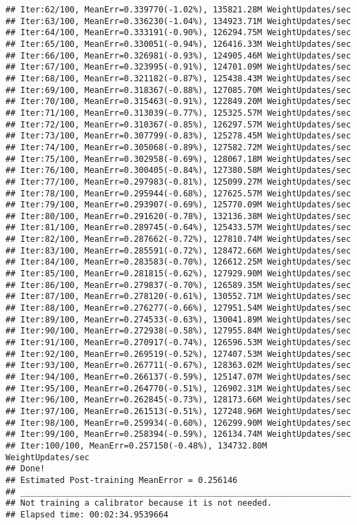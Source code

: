 \documentclass[]{book}
\theoremstyle{definition}
\theoremstyle{definition}
\theoremstyle{definition}
\theoremstyle{remark}
\begin{document}
\begin{verbatim}
## Iter:62/100, MeanErr=0.339770(-1.02%), 135821.28M WeightUpdates/sec
## Iter:63/100, MeanErr=0.336230(-1.04%), 134923.71M WeightUpdates/sec
## Iter:64/100, MeanErr=0.333191(-0.90%), 126294.75M WeightUpdates/sec
## Iter:65/100, MeanErr=0.330051(-0.94%), 126416.33M WeightUpdates/sec
## Iter:66/100, MeanErr=0.326981(-0.93%), 124905.46M WeightUpdates/sec
## Iter:67/100, MeanErr=0.323995(-0.91%), 124701.09M WeightUpdates/sec
## Iter:68/100, MeanErr=0.321182(-0.87%), 125438.43M WeightUpdates/sec
## Iter:69/100, MeanErr=0.318367(-0.88%), 127085.70M WeightUpdates/sec
## Iter:70/100, MeanErr=0.315463(-0.91%), 122849.20M WeightUpdates/sec
## Iter:71/100, MeanErr=0.313039(-0.77%), 125325.57M WeightUpdates/sec
## Iter:72/100, MeanErr=0.310367(-0.85%), 126297.57M WeightUpdates/sec
## Iter:73/100, MeanErr=0.307799(-0.83%), 125278.45M WeightUpdates/sec
## Iter:74/100, MeanErr=0.305068(-0.89%), 127582.72M WeightUpdates/sec
## Iter:75/100, MeanErr=0.302958(-0.69%), 128067.18M WeightUpdates/sec
## Iter:76/100, MeanErr=0.300405(-0.84%), 127380.58M WeightUpdates/sec
## Iter:77/100, MeanErr=0.297983(-0.81%), 125099.27M WeightUpdates/sec
## Iter:78/100, MeanErr=0.295944(-0.68%), 127625.57M WeightUpdates/sec
## Iter:79/100, MeanErr=0.293907(-0.69%), 125770.09M WeightUpdates/sec
## Iter:80/100, MeanErr=0.291620(-0.78%), 132136.38M WeightUpdates/sec
## Iter:81/100, MeanErr=0.289745(-0.64%), 125433.57M WeightUpdates/sec
## Iter:82/100, MeanErr=0.287662(-0.72%), 127810.74M WeightUpdates/sec
## Iter:83/100, MeanErr=0.285591(-0.72%), 128472.66M WeightUpdates/sec
## Iter:84/100, MeanErr=0.283583(-0.70%), 126612.25M WeightUpdates/sec
## Iter:85/100, MeanErr=0.281815(-0.62%), 127929.90M WeightUpdates/sec
## Iter:86/100, MeanErr=0.279837(-0.70%), 126589.35M WeightUpdates/sec
## Iter:87/100, MeanErr=0.278120(-0.61%), 130552.71M WeightUpdates/sec
## Iter:88/100, MeanErr=0.276277(-0.66%), 127951.54M WeightUpdates/sec
## Iter:89/100, MeanErr=0.274533(-0.63%), 130041.89M WeightUpdates/sec
## Iter:90/100, MeanErr=0.272938(-0.58%), 127955.84M WeightUpdates/sec
## Iter:91/100, MeanErr=0.270917(-0.74%), 126596.53M WeightUpdates/sec
## Iter:92/100, MeanErr=0.269519(-0.52%), 127407.53M WeightUpdates/sec
## Iter:93/100, MeanErr=0.267711(-0.67%), 128363.02M WeightUpdates/sec
## Iter:94/100, MeanErr=0.266137(-0.59%), 125147.07M WeightUpdates/sec
## Iter:95/100, MeanErr=0.264770(-0.51%), 126902.31M WeightUpdates/sec
## Iter:96/100, MeanErr=0.262845(-0.73%), 128173.66M WeightUpdates/sec
## Iter:97/100, MeanErr=0.261513(-0.51%), 127248.96M WeightUpdates/sec
## Iter:98/100, MeanErr=0.259934(-0.60%), 126299.90M WeightUpdates/sec
## Iter:99/100, MeanErr=0.258394(-0.59%), 126134.74M WeightUpdates/sec
## Iter:100/100, MeanErr=0.257150(-0.48%), 134732.80M WeightUpdates/sec
## Done!
## Estimated Post-training MeanError = 0.256146
## ___________________________________________________________________
## Not training a calibrator because it is not needed.
## Elapsed time: 00:02:34.9539664
\end{verbatim}
\end{document}
